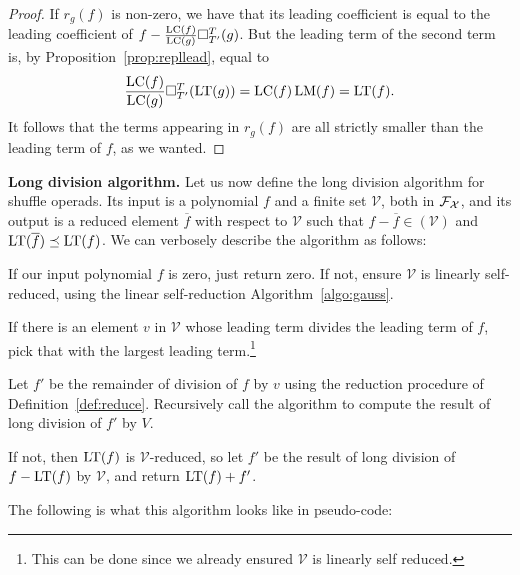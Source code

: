 \begin{proof}
If $r_g(f)$ is non-zero, we have that its leading coefficient is 
equal to the leading coefficient of $f- \frac{\operatorname{LC}(f)}{\operatorname{LC}(g)}\square_{T'}^{T}(g)$. But the leading term of the second term is, by
Proposition~\ref{prop:repllead}, equal to 
\[ \frac{\operatorname{LC}(f)}{\operatorname{LC}(g)}\square_{T'}^{T}(\operatorname{LT}(g)) =  \operatorname{LC}(f) \operatorname{LM}(f) 
	= \operatorname{LT}(f).\]
It follows that the terms appearing in $r_g(f)$ are all strictly smaller
than the leading term of $f$, as we wanted. 
\end{proof}

\textbf{Long division algorithm.}
Let us now define the long division algorithm for shuffle operads.
Its input is a polynomial $f$ and a finite set $\mathcal V$, both
in $\mathcal{F}_{\mathcal{X}}$, and its
output is a reduced element $\overline{f}$ with respect to $\mathcal
V$ such that $f-\overline{f} \in (\mathcal V)$ and $\operatorname{LT}(\overline{f})
\preceq \operatorname{LT}(f)$. We can verbosely describe the algorithm as follows: 
\begin{tenumerate}
\item If our input polynomial
$f$ is zero, just return zero. If not, ensure $\mathcal V$
is linearly self-reduced, using the linear self-reduction
Algorithm~\ref{algo:gauss}.
\item If there is an element $v$ in $\mathcal V$ 
whose leading term divides the
leading term of $f$, pick that with the largest leading term.\footnote{This
 can be done since we already ensured $\mathcal V$ is linearly
self reduced.}
\item Let $f'$ be the remainder of division of $f$
by $v$ using the reduction procedure of Definition~\ref{def:reduce}.
Recursively call the algorithm to compute the result of long
division of $f'$ by $V$.
\item If not, then $\operatorname{LT}(f)$ is $\mathcal V$-reduced, 
so let $f'$ be the result of long division of $f-\operatorname{LT}(f)$ by $\mathcal V$, and return $\operatorname{LT}(f) + f'$.
\end{tenumerate}
The following is what this algorithm looks like in pseudo-code:

